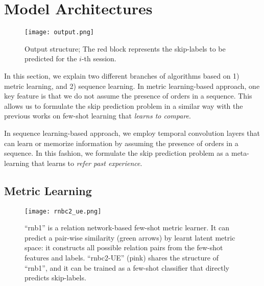 \section{Model Architectures}
\begin{figure}
\texttt{[image: output.png]}
\caption{Output structure; The red block represents the skip-labels to be predicted for the $i$-th session.}
\end{figure}
In this section, we explain two different branches of algorithms based on 1) metric learning, and 2) sequence learning.
In metric learning-based approach, one key feature is that we do not assume the presence of orders in a sequence. This allows us to formulate the skip prediction problem in a similar way with the previous  works\cite{sung2018learning} on few-shot learning that {\it learns to compare}.

In sequence learning-based approach, we employ temporal convolution layers that can learn or memorize information by assuming the presence of orders in a sequence. In this fashion, we formulate the skip prediction problem as a meta-learning\cite{snail} that learns to {\it refer past experience}.  

\subsection{Metric Learning}

\begin{figure}
\texttt{[image: rnbc2\_ue.png]}
\caption{``rnb1'' is a relation network-based few-shot metric learner. It can predict a pair-wise similarity (green arrows) by learnt latent metric space: it constructs  all possible relation pairs from the few-shot features and labels. ``rnbc2-UE'' (pink) shares the structure of ``rnb1'', and it can be trained as a few-shot classifier that directly predicts skip-labels.}
\label{rnbc2ue}
\end{figure}

